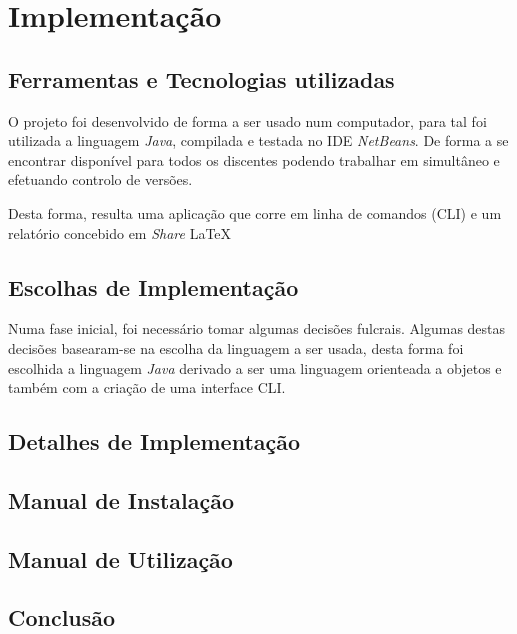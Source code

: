 \chapter{Implementação}
\label{chap:implmentacao}

\section{Ferramentas e Tecnologias utilizadas}
\label{sec:ferramentas}
O projeto foi desenvolvido de forma a ser usado num computador, para tal foi utilizada a linguagem \textit{Java}, compilada e testada no IDE \textit{NetBeans}. De forma a se encontrar disponível para todos os discentes podendo trabalhar em simultâneo e efetuando controlo de versões.


Desta forma, resulta uma aplicação que corre em linha de comandos (CLI) e um relatório concebido em \emph{Share} \LaTeX



\section{Escolhas de Implementação}
\label{sec:escolhas}

Numa fase inicial, foi necessário tomar algumas decisões fulcrais. Algumas destas decisões basearam-se na escolha da linguagem a ser usada, desta forma foi escolhida a linguagem \textit{Java} derivado a ser uma linguagem orienteada a objetos e também com a criação de uma interface CLI.

\section{Detalhes de Implementação}
\label{sec:detalhes}

\section{Manual de Instalação}
\label{sec:instalacao}

\section{Manual de Utilização}
\label{sec:utilizacao}

\section{Conclusão}
\label{sec:conc}